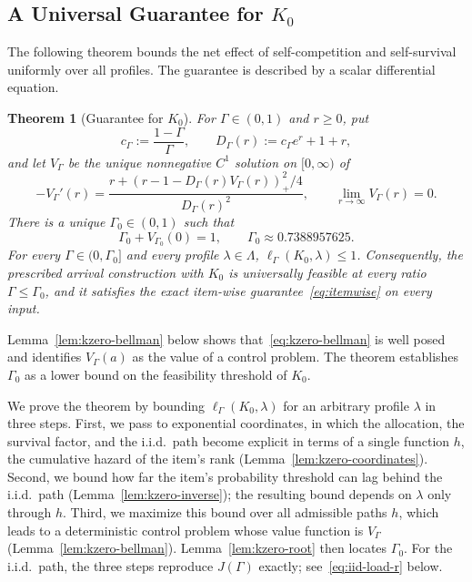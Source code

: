 \documentclass[11pt]{article}
\newtheorem{theorem}{Theorem}[section]
\theoremstyle{definition}
\theoremstyle{remark}
\newcommand{\pos}[1]{\left(#1\right)_+}
\begin{document}
\subsection{A Universal Guarantee for \texorpdfstring{$K_0$}{K0}}
\label{sec:kzero-analysis}

The following theorem bounds the net effect of self-competition and self-survival uniformly over all profiles.
The guarantee is described by a scalar differential equation.

\begin{theorem}[Guarantee for $K_0$]\label{thm:kzero-analytic}
For $\Gamma\in(0,1)$ and $r\ge0$, put
\begin{equation}\label{eq:kzero-D}
 c_\Gamma:=\frac{1-\Gamma}{\Gamma},
 \qquad
 D_\Gamma(r):=c_\Gamma e^r+1+r,
\end{equation}
and let $V_\Gamma$ be the unique nonnegative $C^1$ solution on $[0,\infty)$ of
\begin{equation}\label{eq:kzero-bellman}
 -V_\Gamma'(r)
 =\frac{r+\pos{r-1-D_\Gamma(r)V_\Gamma(r)}^2/4}{D_\Gamma(r)^2},
 \qquad
 \lim_{r\to\infty}V_\Gamma(r)=0.
\end{equation}
There is a unique $\Gamma_0\in(0,1)$ such that
\begin{equation}\label{eq:kzero-root}
 \Gamma_0+V_{\Gamma_0}(0)=1,
 \qquad
 \Gamma_0\approx0.7388957625.
\end{equation}
For every $\Gamma\in(0,\Gamma_0]$ and every profile $\lambda\in\Lambda$, $\ell_\Gamma(K_0,\lambda)\le1$.
Consequently, the prescribed arrival construction with $K_0$ is universally feasible at every ratio $\Gamma\le\Gamma_0$, and it satisfies the exact item-wise guarantee~\eqref{eq:itemwise} on every input.
\end{theorem}

Lemma~\ref{lem:kzero-bellman} below shows that~\eqref{eq:kzero-bellman}
is well posed and identifies $V_\Gamma(a)$ as the value of a control problem.
The theorem establishes $\Gamma_0$ as a lower bound on the feasibility
threshold of $K_0$.

We prove the theorem by bounding $\ell_\Gamma(K_0,\lambda)$ for an
arbitrary profile $\lambda$ in three steps.
First, we pass to exponential coordinates, in which the allocation, the survival factor, and the i.i.d.\ path become explicit in terms of a single function $h$, the cumulative hazard of the item's rank (Lemma~\ref{lem:kzero-coordinates}).
Second, we bound how far the item's probability threshold can lag behind the i.i.d.\ path (Lemma~\ref{lem:kzero-inverse}); the resulting bound depends on $\lambda$ only through $h$.
Third, we maximize this bound over all admissible paths $h$, which leads to a deterministic control problem whose value function is $V_\Gamma$ (Lemma~\ref{lem:kzero-bellman}).
Lemma~\ref{lem:kzero-root} then locates $\Gamma_0$.
For the i.i.d.\ path, the three steps reproduce $J(\Gamma)$ exactly; see~\eqref{eq:iid-load-r} below.
\end{document}
